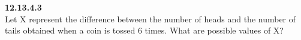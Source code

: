 \documentclass[11pt]{book}
\begin{document}
\textbf{12.13.4.3}\\
Let X represent the difference between the number of heads and the number of
tails obtained when a coin is tossed 6 times. What are possible values of X?
\end{document}
